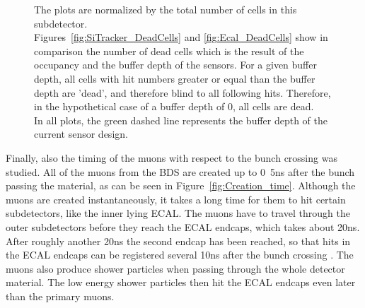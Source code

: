 \begin{figure}
{    The plots are normalized by the total number of cells in this subdetector.\\
    Figures~\ref{fig:SiTracker_DeadCells} and \ref{fig:Ecal_DeadCells} show in comparison the number of dead cells which is the result of the occupancy and the buffer depth of the sensors.
    For a given buffer depth, all cells with hit numbers greater or equal than the buffer depth are 'dead', and therefore blind to all following hits.
    Therefore, in the hypothetical case of a buffer depth of 0, all cells are dead.\\
    In all plots, the green dashed line represents the buffer depth of the current sensor design.
    }
    \label{fig:Occupancy_DeadCells}
\end{figure}

Finally, also the timing of the muons with respect to the bunch crossing was studied.
All of the muons from the BDS are created up to \unit{0.5}{ns} after the bunch passing the material, as can be seen in Figure~\ref{fig:Creation_time}.
Although the muons are created instantaneously, it takes a long time for them to hit certain subdetectors, like the inner lying ECAL.
The muons have to travel through the outer subdetectors before they reach the ECAL endcaps, which takes about \unit{20}{ns}.
After roughly another \unit{20}{ns} the second endcap has been reached, so that hits in the ECAL endcaps can be registered several \unit{10}{ns} after the bunch crossing .
The muons also produce shower particles when passing through the whole detector material.
The low energy shower particles then hit the ECAL endcaps even later than the primary muons.

